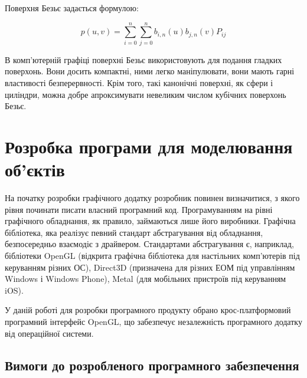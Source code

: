 \let\mypdfximage\pdfximage\def\pdfximage{\immediate\mypdfximage}\documentclass[14pt,a4paper]{extarticle}
\theoremstyle{definition}
\renewcommand{\[}{\begin{singlespace}\begin{equation*}}
\renewcommand{\]}{\end{equation*}\end{singlespace}}
\renewcommand{\+}{\discretionary{\mbox{\scriptsize$\hookleftarrow$}}{}{}}
\begin{document}
Поверхня Безьє задається формулою:
\[p(u,v)=\sum_{i=0}^n\sum_{j=0}^n b_{i,n}(u) b_{j,n}(v) P_{ij}\]

В комп'ютерній графіці поверхні Безьє використовують для подання гладких поверхонь. Вони досить компактні, ними легко маніпулювати, вони мають гарні властивості безперервності. Крім того, такі канонічні поверхні, як сфери і циліндри, можна добре апроксимувати невеликим числом кубічних поверхонь Безьє.

\section{Розробка програми для моделювання об'єктів}

На початку розробки графічного додатку розробник повинен визначитися, з якого рівня починати писати власний програмний код. Програмуванням на рівні графічного обладнання, як правило, займаються лише його виробники. Графічна бібліотека, яка реалізує певний стандарт абстрагування від обладнання, безпосередньо взаємодіє з драйвером. Стандартами абстрагування є, наприклад, бібліотеки OpenGL (відкрита графічна бібліотека для настільних комп'ютерів під керуванням різних ОС), Direct3D (призначена для різних ЕОМ під управлінням Windows і Windows Phone), Metal (для мобільних пристроїв під керуванням iOS). \cite{ryabin}

У даній роботі для розробки програмного продукту обрано крос-платформовий програмний інтерфейс OpenGL, що забезпечує незалежність програмного додатку від операційної системи.

\subsection{Вимоги до розробленого програмного забезпечення}
\end{document}
